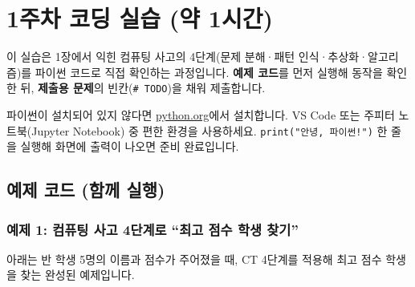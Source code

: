 \documentclass[
  korean,
  11pt,
  a4paper,
  DIV=11,
  numbers=noendperiod]{scrreprt}
\begin{document}

\chapter{1주차 코딩 실습 (약 1시간)}\label{sec-ch1-lab}

이 실습은 1장에서 익힌 컴퓨팅 사고의 4단계(문제 분해·패턴
인식·추상화·알고리즘)를 파이썬 코드로 직접 확인하는 과정입니다.
\textbf{예제 코드}를 먼저 실행해 동작을 확인한 뒤, \textbf{제출용
문제}의 빈칸(\texttt{\#\ TODO})을 채워 제출합니다.

\begin{tcolorbox}[enhanced jigsaw, arc=.35mm, bottomrule=.15mm, bottomtitle=1mm, breakable, colback=white, colbacktitle=quarto-callout-note-color!10!white, colframe=quarto-callout-note-color-frame, coltitle=black, left=2mm, leftrule=.75mm, opacityback=0, opacitybacktitle=0.6, rightrule=.15mm, title=\textcolor{quarto-callout-note-color}{\faInfo}\hspace{0.5em}{실습 환경 확인}, titlerule=0mm, toprule=.15mm, toptitle=1mm]

파이썬이 설치되어 있지 않다면
\href{https://www.python.org/downloads/}{python.org}에서 설치합니다. VS
Code 또는 주피터 노트북(Jupyter Notebook) 중 편한 환경을 사용하세요.
\texttt{print("안녕,\ 파이썬!")} 한 줄을 실행해 화면에 출력이 나오면
준비 완료입니다.

\end{tcolorbox}

\section{예제 코드 (함께
실행)}\label{uxc608uxc81c-uxcf54uxb4dc-uxd568uxaed8-uxc2e4uxd589}

\subsection{예제 1: 컴퓨팅 사고 4단계로 ``최고 점수 학생
찾기''}\label{uxc608uxc81c-1-uxcef4uxd4e8uxd305-uxc0acuxace0-4uxb2e8uxacc4uxb85c-uxcd5cuxace0-uxc810uxc218-uxd559uxc0dd-uxcc3euxae30}

아래는 반 학생 5명의 이름과 점수가 주어졌을 때, CT 4단계를 적용해 최고
점수 학생을 찾는 완성된 예제입니다.
\end{document}
